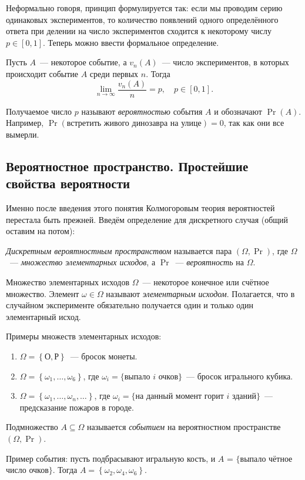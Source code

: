 Неформально говоря, принцип формулируется так: если мы проводим серию одинаковых экспериментов, то количество появлений одного определённого ответа при делении на число экспериментов сходится к некоторому числу \(p \in [0, 1]\). Теперь можно ввести формальное определение.
\begin{frequency-stability}
    Пусть \(A\)~--- некоторое событие, а \(v_{n}(A)\)~--- число экспериментов, в которых происходит событие \(A\) среди первых \(n\). Тогда \[\lim_{n \to \infty}\frac{v_{n}(A)}{n} = p,\quad p \in [0, 1].\]
\end{frequency-stability}
Получаемое число \(p\) называют \emph{вероятностью} события \(A\) и обозначают \(\Pr(A)\). Например, \(\Pr(\text{встретить живого динозавра на улице}) = 0\), так как они все вымерли.

\subsection{Вероятностное пространство. Простейшие свойства вероятности}
Именно после введения этого понятия Колмогоровым теория вероятностей перестала быть прежней. Введём определение для дискретного случая (общий оставим на потом):
\begin{definition}
    \emph{Дискретным вероятностным пространством} называется пара \((\Omega, \Pr)\), где \(\Omega\)~--- \emph{множество элементарных исходов}, а \(\Pr\)~--- \emph{вероятность} на \(\Omega\).
\end{definition}

Множество элементарных исходов \(\Omega\)~--- некоторое конечное или счётное множество. Элемент \(\omega \in \Omega\) называют \emph{элементарным исходом}. Полагается, что в случайном эксперименте обязательно получается один и только один элементарный исход.

Примеры множеств элементарных исходов:
\begin{enumerate}
    \item \(\Omega = \left\{\text{О}, \text{Р}\right\}\)~--- бросок монеты.
    \item \(\Omega = \left\{\omega_1, \ldots, \omega_6\right\}\), где \(\omega_i = \{\)выпало \(i\) очков\(\}\)~--- бросок игрального кубика.
    \item \(\Omega = \left\{\omega_1, \ldots, \omega_n, \ldots \right\}\), где \(\omega_i = \{\)на данный момент горит \(i\) зданий\(\}\)~---  предсказание пожаров в городе.
\end{enumerate}

\begin{definition}
    Подмножество \(A \subseteq \Omega\) называется \emph{событием} на вероятностном пространстве \((\Omega, \Pr)\).
\end{definition}
Пример события: пусть подбрасывают игральную кость, и \(A\) = \(\{\)выпало чётное число очков\(\}\). Тогда \(A = \left\{\omega_2, \omega_4, \omega_6 \right\}\).

